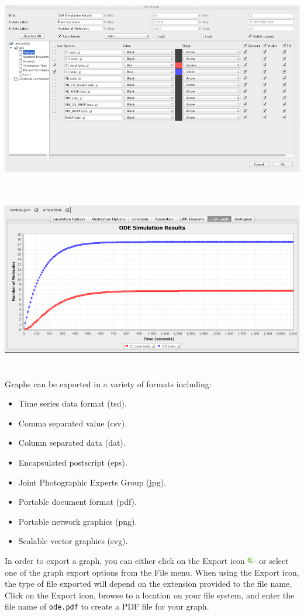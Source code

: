\documentclass[titlepage,11pt]{article}
\begin{document}
\begin{center}
\includegraphics[height=90mm]{screenshots/odeResults}\\
\includegraphics[height=80mm]{screenshots/odeSimResults}
\end{center}

Graphs can be exported in a variety of formats including:
\begin{itemize}
\item Time series data format (tsd).
\item Comma separated value (csv).
\item Column separated data (dat).
\item Encapsulated postscript (eps). 
\item Joint Photographic Experts Group (jpg). 
\item Portable document format (pdf).
\item Portable network graphics (png). 
\item Scalable vector graphics (svg).
\end{itemize}
In order to export a graph, you can either click on the Export icon \includegraphics{../gui/icons/export} or select one of the graph export options from the File menu.  When using the Export icon, the type of file exported will depend on the extension provided to the file name.  Click on the Export icon, browse to a location on your file system, and enter the file name of {\tt ode.pdf} to create a PDF file for your graph.
\end{document}
